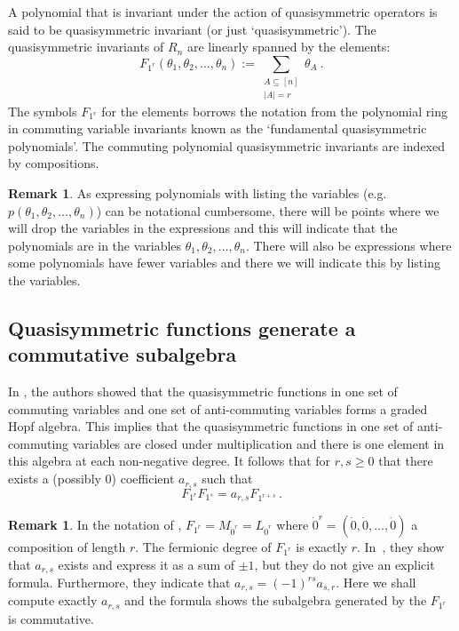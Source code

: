 \documentclass[11pt]{amsart}
\theoremstyle{definition}
\newtheorem{remark}[theorem]{Remark}
\numberwithin{equation}{section}
\begin{document}
A polynomial that is invariant under the action of quasisymmetric operators
is said to be quasisymmetric invariant (or just `quasisymmetric').
The quasisymmetric invariants of $R_n$ are
linearly spanned by the elements:
\begin{equation}\label{eq:defF}
F_{1^r}(\theta_1, \theta_2, \ldots, \theta_n) := \sum_{\substack{A \subseteq [n]\\|A|=r}} \theta_A~.
\end{equation}
The symbols $F_{1^r}$ for the elements borrows the notation from the
polynomial ring in commuting variable invariants known as the `fundamental
quasisymmetric polynomials'.  The commuting polynomial quasisymmetric
invariants are indexed by compositions.


\begin{remark}
As expressing polynomials with listing the variables
(e.g. $p(\theta_1, \theta_2, \ldots, \theta_n)$) can be notational cumbersome,
there will be points where we will drop the variables in the expressions
and this will indicate that the polynomials are in the
variables $\theta_1, \theta_2, \ldots, \theta_n$.  There will also
be expressions where some polynomials have fewer variables and there
we will indicate this by listing the variables.
\end{remark}

\subsection{Quasisymmetric functions generate a commutative subalgebra}
In \cite{FLP}, the authors showed that the quasisymmetric functions in
one set of commuting variables and one set of anti-commuting variables
forms a graded Hopf algebra.  This implies that the quasisymmetric functions
in one set of anti-commuting variables are closed under multiplication
and there is one element in this algebra at each non-negative degree.
It follows that for $r, s \geq0$ that there exists a (possibly $0$)
coefficient $a_{r,s}$ such that
\begin{equation}\label{eq:qsalg}
F_{1^r} F_{1^s} = a_{r,s} F_{1^{r+s}}\,.
\end{equation}

\begin{remark}
In  the notation of \cite{FLP}, $F_{1^r}=M_{\dot{0}^r}=L_{\dot{0}^r}$ where $\dot{0}^r=(\dot{0},\dot{0},\ldots,\dot{0})$ a composition of length $r$.
The fermionic degree of $F_{1^r}$ is exactly $r$.
 In~\cite{FLP}, they show that $a_{r,s}$ exists and express it as a sum of $\pm 1$, but they do not give an explicit formula.
Furthermore, they indicate  that $a_{r,s}=(-1)^{rs}a_{s,r}$. Here we shall compute exactly $a_{r,s}$
and the formula shows the subalgebra generated by the $F_{1^r}$ is commutative.
\end{remark}
\end{document}
